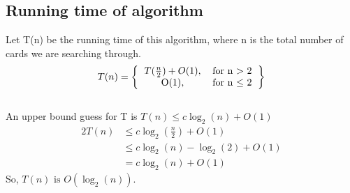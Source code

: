 \documentclass[a4paper,12pt]{article}
\begin{document}
\subsection*{Running time of algorithm}
Let T(n) be the running time of this algorithm, where n is the total number of cards we are searching through.\\

\[T(n) = \left\{
\begin{tabular}{c c}
    \(T(\frac{n}{2}) + O(1)\),& for n \(>\) 2 \\
    O(1),& for n \(\le\) 2\\
\end{tabular}
\right\}\]\\

An upper bound guess for T is \(T(n) \le c\log_2 (n) + O(1) \)
\begin{alignat*}{2}
  T(n)& \le c\log_2 (\frac{n}{2}) + O(1) \\
  {}& \le c\log_2 (n) - \log_2 (2) + O(1)\\
  {}& = c\log_2(n) + O(1)
\end{alignat*}
So, \(T(n) \text{ is } O(\log_2 (n))\).
\end{document}
